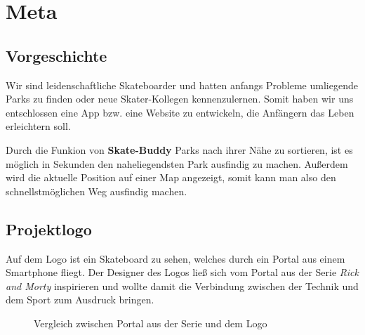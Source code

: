 \chapter{Meta}

\section{Vorgeschichte}

Wir sind leidenschaftliche Skateboarder und hatten anfangs Probleme umliegende Parks
zu finden oder neue Skater-Kollegen kennenzulernen. Somit haben wir uns entschlossen eine
App bzw. eine Website zu entwickeln, die Anfängern das Leben erleichtern soll.

Durch die Funkion von \textbf{Skate-Buddy} Parks nach ihrer Nähe zu sortieren, ist es möglich
in Sekunden den naheliegendsten Park ausfindig zu machen. Außerdem wird die aktuelle Position
auf einer Map angezeigt, somit kann man also den schnellstmöglichen Weg ausfindig machen.    

\section{Projektlogo}
\label{logo}

Auf dem Logo ist ein Skateboard zu sehen, welches durch ein Portal aus einem Smartphone fliegt.
Der Designer des Logos ließ sich vom Portal aus der Serie \textit{Rick and Morty} inspirieren und wollte damit die Verbindung zwischen
der Technik und dem Sport zum Ausdruck bringen.



\begin{figure}[H]
    \centering
    \hfill
    \hfill
    \hfill
    \caption{Vergleich zwischen Portal aus der Serie und dem Logo}
\end{figure}